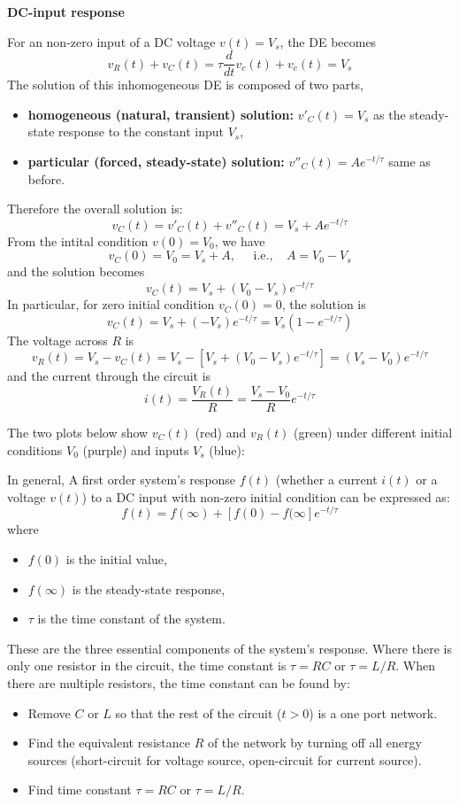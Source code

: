 {\bf DC-input response}

For an non-zero input of a DC voltage $v(t)=V_s$, the DE becomes
\[	v_R(t)+v_C(t)=\tau\frac{d}{dt} v_c(t)+v_c(t)=V_s	\]
The solution of this inhomogeneous DE is composed of two parts, 
\begin{itemize}
\item {\bf homogeneous (natural, transient) solution:} $v'_C(t)=V_s$ as
	the steady-state response to the constant input $V_s$,
\item {\bf particular (forced, steady-state) solution:} 
	$v''_C(t)=A e^{-t/\tau}$ same as before.
\end{itemize}
Therefore the overall solution is:
\[	v_C(t)=v'_C(t)+v''_C(t)=V_s+A e^{-t/\tau}	\]
From the intital condition $v(0)=V_0$, we have
\[	v_C(0)=V_0=V_s+A,\;\;\;\;\;\mbox{i.e.,}\;\;\;\;A=V_0-V_s	\]
and the solution becomes
\[	v_C(t)=V_s+(V_0-V_s) e^{-t/\tau}	\]
In particular, for zero initial condition $v_C(0)=0$, the solution is
\[	v_C(t)=V_s+(-V_s) e^{-t/\tau}=V_s(1-e^{-t/\tau})		\]
The voltage across $R$ is
\[
v_R(t)=V_s-v_C(t)=V_s-[V_s+(V_0-V_s) e^{-t/\tau}]=(V_s-V_0) e^{-t/\tau}
\]
and the current through the circuit is
\[	i(t)=\frac{V_R(t)}{R}=\frac{V_s-V_0}{R} e^{-t/\tau}	\]

The two plots below show $v_C(t)$ (red) and $v_R(t)$ (green) under
different initial conditions $V_0$ (purple) and inputs $V_s$ (blue):


In general, A first order system's response $f(t)$ (whether a current 
$i(t)$ or a voltage $v(t)$) to a DC input with non-zero initial condition 
can be expressed as:
\[	f(t)=f(\infty)+[f(0)-f(\infty] e^{-t/\tau}	\]
where 
\begin{itemize}
\item $f(0)$ is the initial value, 
\item $f(\infty)$ is the steady-state response, 
\item $\tau$ is the time constant of the system.
\end{itemize}
These are the three essential components of the system's response.
Where there is only one resistor in the circuit, the time constant
is $\tau=RC$ or $\tau=L/R$. When there are multiple resistors, the
time constant can be found by:
\begin{itemize}
\item Remove $C$ or $L$ so that the rest of the circuit ($t>0$) is 
	a one port network.
\item Find the equivalent resistance $R$ of the network by turning 
	off all energy sources (short-circuit for voltage source,
	open-circuit for current source).
\item Find time constant $\tau=RC$ or $\tau=L/R$.
\end{itemize}

